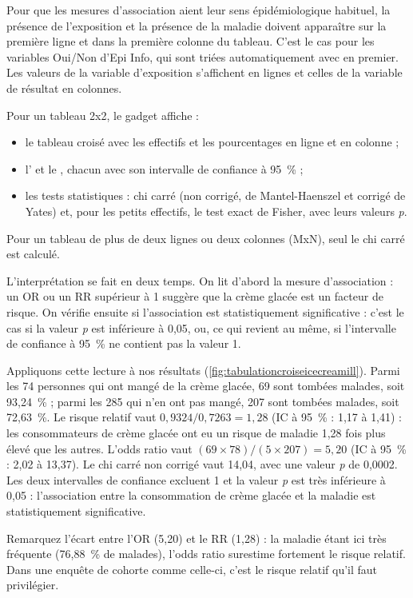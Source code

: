 Pour que les mesures d'association aient leur sens épidémiologique habituel, la présence de l'exposition et la présence de la maladie doivent apparaître sur la première ligne et dans la première colonne du tableau. C'est le cas pour les variables Oui/Non d'Epi Info, qui sont triées automatiquement avec  en premier. Les valeurs de la variable d'exposition s'affichent en lignes et celles de la variable de résultat en colonnes.

Pour un tableau 2x2, le gadget affiche :
\begin{itemize}
	\item le tableau croisé avec les effectifs et les pourcentages en ligne et en colonne ;
	\item l' et le , chacun avec son intervalle de confiance à 95~\% ;
	\item les tests statistiques : chi carré (non corrigé, de Mantel-Haenszel et corrigé de Yates) et, pour les petits effectifs, le test exact de Fisher, avec leurs valeurs \textit{p}.
\end{itemize}

Pour un tableau de plus de deux lignes ou deux colonnes (MxN), seul le chi carré est calculé.

L'interprétation se fait en deux temps. On lit d'abord la mesure d'association : un OR ou un RR supérieur à 1 suggère que la crème glacée est un facteur de risque. On vérifie ensuite si l'association est statistiquement significative : c'est le cas si la valeur \textit{p} est inférieure à 0,05, ou, ce qui revient au même, si l'intervalle de confiance à 95~\% ne contient pas la valeur 1.

Appliquons cette lecture à nos résultats (\autoref{fig:tabulationcroiseicecreamill}). Parmi les 74 personnes qui ont mangé de la crème glacée, 69 sont tombées malades, soit 93,24~\% ; parmi les 285 qui n'en ont pas mangé, 207 sont tombées malades, soit 72,63~\%. Le risque relatif vaut $0{,}9324/0{,}7263 = 1{,}28$ (IC à 95~\% : 1,17 à 1,41) : les consommateurs de crème glacée ont eu un risque de maladie 1,28 fois plus élevé que les autres. L'odds ratio vaut $(69 \times 78)/(5 \times 207) = 5{,}20$ (IC à 95~\% : 2,02 à 13,37). Le chi carré non corrigé vaut 14,04, avec une valeur \textit{p} de 0,0002. Les deux intervalles de confiance excluent 1 et la valeur \textit{p} est très inférieure à 0,05 : l'association entre la consommation de crème glacée et la maladie est statistiquement significative.

Remarquez l'écart entre l'OR (5,20) et le RR (1,28) : la maladie étant ici très fréquente (76,88~\% de malades), l'odds ratio surestime fortement le risque relatif. Dans une enquête de cohorte comme celle-ci, c'est le risque relatif qu'il faut privilégier.

